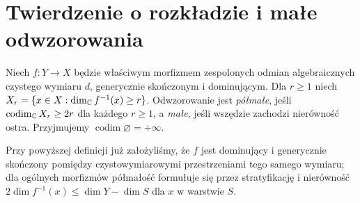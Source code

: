 \section{Twierdzenie o rozkładzie i małe odwzorowania}
\begin{definicja}
Niech $f:Y\to X$ będzie właściwym morfizmem
zespolonych odmian algebraicznych czystego wymiaru $d$,
generycznie skończonym i dominującym. Dla $r\ge1$
niech $X_r=\{x\in X:\dim_{\mathbb{C}} f^{-1}(x)\ge r\}$.
Odwzorowanie jest \emph{półmałe}, jeśli
$\operatorname{codim}_{\mathbb{C}} X_r\ge2r$ dla każdego $r\ge1$,
a \emph{małe}, jeśli wszędzie zachodzi
nierówność ostra. Przyjmujemy
$\operatorname{codim}\varnothing=+\infty$.
\end{definicja}
\begin{uwaga}
Przy powyższej definicji już założyliśmy, że $f$ jest
dominujący i generycznie skończony pomiędzy
czystowymiarowymi przestrzeniami tego samego wymiaru;
dla ogólnych morfizmów półmałość formułuje się przez
stratyfikację i nierówność
$2\dim f^{-1}(x)\le\dim Y-\dim S$
dla $x$ w warstwie $S$.
\end{uwaga}


